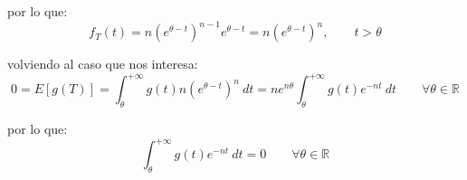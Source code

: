 \begin{ejercicio}
    por lo que:
    \begin{equation*}
        f_T(t) = n{\left(e^{\theta-t}\right)}^{n-1}e^{\theta-t} = n{\left(e^{\theta-t}\right)}^{n}, \qquad t>\theta
    \end{equation*}

    volviendo al caso que nos interesa:
    \begin{equation*}
        0 = E[g(T)] = \int_{\theta}^{+\infty} g(t)n{\left(e^{\theta-t}\right)}^{n} ~dt  = ne^{n\theta} \int_{\theta}^{+\infty} g(t)e^{-nt} ~dt  \qquad \forall \theta \in \mathbb{R}
    \end{equation*}

    por lo que:
    \begin{equation*}
        \int_{\theta}^{+\infty} g(t)e^{-nt}~dt  = 0 \qquad \forall \theta\in \mathbb{R}
    \end{equation*}
\end{ejercicio}

